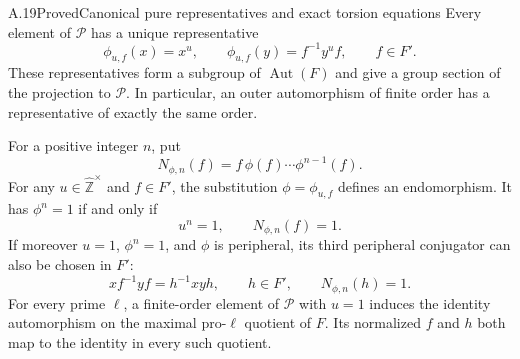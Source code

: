 \begin{statement}{A.19}{Proved}{Canonical pure representatives and exact torsion equations}
Every element of $\mathcal P$ has a unique representative
\[
 \phi_{u,f}(x)=x^u,\qquad
 \phi_{u,f}(y)=f^{-1}y^u f,\qquad f\in F'.
\]
These representatives form a subgroup of $\operatorname{Aut}(F)$
and give a group section of the projection to $\mathcal P$.
In particular, an outer automorphism of finite order has a
representative of exactly the same order.

For a positive integer $n$, put
\[
 N_{\phi,n}(f)=f\,\phi(f)\cdots\phi^{n-1}(f).
\]
For any $u\in\widehat{\mathbb Z}^{\times}$ and $f\in F'$, the
substitution $\phi=\phi_{u,f}$ defines an endomorphism.
It has $\phi^n=1$ if and only if
\[
                         u^n=1,\qquad N_{\phi,n}(f)=1.
\]
If moreover $u=1$, $\phi^n=1$, and $\phi$ is peripheral, its
third peripheral conjugator can also be chosen in $F'$:
\[
                 x f^{-1}yf=h^{-1}xyh,\qquad h\in F',
                 \qquad N_{\phi,n}(h)=1.
\]
For every prime $\ell$, a finite-order element of $\mathcal P$
with $u=1$ induces the identity automorphism on the maximal
pro-$\ell$ quotient of $F$. Its normalized $f$ and $h$ both
map to the identity in every such quotient.
\end{statement}
